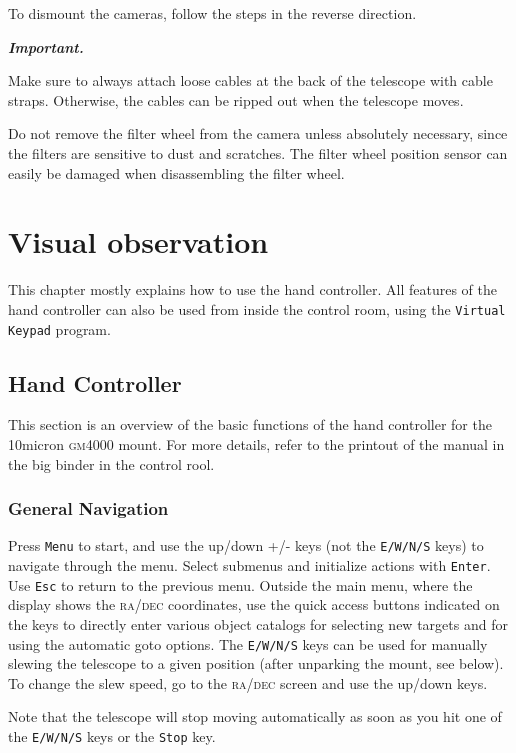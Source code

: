 \documentclass[a4paper, 11pt, fleqn]{memoir}
\newenvironment{important}{
    \begin{propBox}
        \textcolor{oneblue}{\textbf{\textit{Important.}}}
        }{
    \end{propBox}
}
\begin{document}
To dismount the cameras, follow the steps in the reverse direction.


\begin{important}
    Make sure to always attach loose cables at the back of the telescope with cable straps. Otherwise, the cables can be ripped out when the telescope moves.
\end{important}


Do not remove the filter wheel from the camera unless absolutely necessary, since the filters are sensitive to dust and scratches.
The filter wheel position sensor can easily be damaged when disassembling the filter wheel.

\chapter{Visual observation}

This chapter mostly explains how to use the hand controller.
All features of the hand controller can also be used from inside the control room, using the \texttt{Virtual Keypad} program.

\section{Hand Controller}

This section is an overview of the basic functions of the hand controller for the 10micron \textsc{gm4000} mount.
For more details, refer to the printout of the manual in the big binder in the control rool.

\subsection{General Navigation}

Press \texttt{Menu} to start, and use the up/down +/- keys (not the \texttt{E/W/N/S} keys) to navigate through the menu.
Select submenus and initialize actions with \texttt{Enter}.
Use \texttt{Esc} to return to the previous menu.
Outside the main menu, where the display shows the \textsc{ra/dec} coordinates, use the quick access buttons indicated on the keys to directly enter various object catalogs for selecting new targets and for using the automatic goto options.
The \texttt{E/W/N/S} keys can be used for manually slewing the telescope to a given position (after unparking the mount, see below).
To change the slew speed, go to the \textsc{ra/dec} screen and use the up/down keys.

Note that the telescope will stop moving automatically as soon as you hit one of the \texttt{E/W/N/S} keys or the \texttt{Stop} key.
\end{document}
